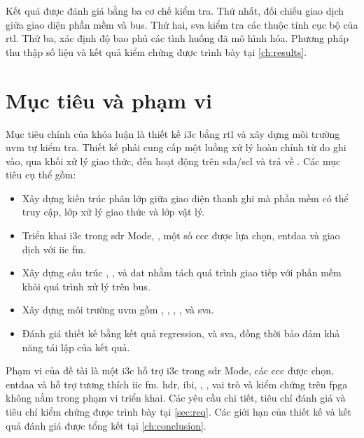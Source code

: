 Kết quả được đánh giá bằng ba cơ chế kiểm tra. Thứ nhất, \Scoreboard{} đối chiếu giao dịch giữa giao diện phần
mềm và bus. Thứ hai, \gls{sva} kiểm tra các thuộc tính cục bộ của \gls{rtl}. Thứ ba, \FunctionalCoverage{} xác định độ bao phủ các tình huống đã mô hình hóa. Phương pháp thu thập số liệu và kết quả kiểm chứng được trình bày tại
\cref{ch:results}.

\section{Mục tiêu và phạm vi}
\label{sec:intro-objective}

Mục tiêu chính của khóa luận là thiết kế \gls{i3c} \Controller{} bằng \SystemVerilog{} \gls{rtl} và xây dựng môi trường \gls{uvm} tự kiểm tra.
Thiết kế phải cung cấp một luồng xử lý hoàn chỉnh từ \CommandDescriptor{} do \Host{} ghi vào, qua khối xử lý giao thức, đến hoạt động trên \gls{sda}/\gls{scl} và trả về \ResponseDescriptor{}. Các mục tiêu cụ thể gồm:

\begin{itemize}
	\item Xây dựng kiến trúc phân lớp giữa giao diện thanh ghi mà phần mềm có thể truy cập, lớp xử lý giao thức và lớp vật lý.
	\item Triển khai \gls{i3c} \PrivateTransfer{} trong \gls{sdr} Mode, \ImmediateDataTransfer{}, một số
	      \gls{ccc} được lựa chọn, \gls{entdaa} và giao dịch với \Target{} \gls{iic} \gls{fm}.
	\item Xây dựng cấu trúc \CommandFifo{}, \ResponseFifo{}, \TxRxFifo{} và \gls{dat} nhằm tách quá trình giao tiếp với
	      phần mềm khỏi quá trình xử lý trên bus.
	\item Xây dựng môi trường \gls{uvm} gồm \RegisterAgent{}, \IThreeCAgent{}, \VirtualSequencer{}, \Scoreboard{},
	      \FunctionalCoverage{} và \gls{sva}.
	\item Đánh giá thiết kế bằng kết quả regression, \FunctionalCoverage{} và \gls{sva}, đồng thời bảo đảm khả năng tái lập của kết quả.
\end{itemize}

Phạm vi của đề tài là một \gls{i3c} \Controller{} hỗ trợ \gls{i3c} \PrivateWriteRead{} trong \gls{sdr} Mode, các \gls{ccc} được chọn, \gls{entdaa} và hỗ trợ
tương thích \gls{iic} \gls{fm}. \gls{hdr}, \gls{ibi}, \HotJoin{}, \SecondaryController{}, vai trò
\Target{} và kiểm chứng trên \gls{fpga} không nằm trong phạm vi triển khai. Các yêu cầu chi tiết, tiêu chí đánh giá
và tiêu chí kiểm chứng được trình bày tại
\cref{sec:req}. Các giới hạn của thiết kế và kết quả đánh giá được tổng kết tại \cref{ch:conclusion}.

